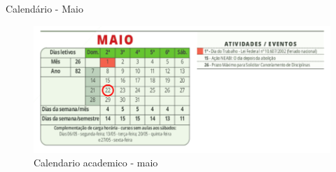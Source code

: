 \documentclass{beamer}
\begin{document}
\begin{frame}[fragile]{Calendário - Maio}
      \begin{figure}[H]
            \centerline{\includegraphics[width=1.1\textwidth]{assets/aula-tads-sopa2-2023-05-22/maio.png}}
            \caption{Calendario academico - maio}
        \end{figure}
\end{frame}


\backmatter
\end{document}
